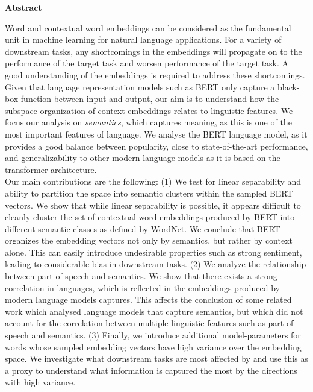 \newpage
{\Huge \bf Abstract}
\vspace{24pt} 


Word and contextual word embeddings can be considered as the fundamental unit in machine learning for natural language applications.
For a variety of downstream tasks, any shortcomings in the embeddings will propagate on to the performance of the target task and worsen performance of the target task.
A good understanding of the embeddings is required to address these shortcomings.
Given that language representation models such as BERT only capture a black-box function between input and output, our aim is to understand how the subspace organization of context embeddings relates to linguistic features.
We focus our analysis on \textit{semantics}, which captures meaning, as this is one of the most important features of language. 
We analyse the BERT language model, as it provides a good balance between popularity, close to state-of-the-art performance, and generalizability to other modern language models as it is based on the transformer architecture.
\\

Our main contributions are the following: (1) We test for linear separability and ability to partition the space into semantic clusters within the sampled BERT vectors.
We show that while linear separability is possible, it appears difficult to cleanly cluster the set of contextual word embeddings produced by BERT into different semantic classes as defined by WordNet.
We conclude that BERT organizes the embedding vectors not only by semantics, but rather by context alone.
This can easily introduce undesirable properties such as strong sentiment, leading to considerable bias in downstream tasks.
(2) We analyze the relationship between part-of-speech and semantics. 
We show that there exists a strong correlation in languages, which is reflected in the embeddings produced by modern language models captures.
This affects the conclusion of some related work which analysed language models that capture semantics, but which did not account for the correlation between multiple linguistic features such as part-of-speech and semantics.
(3) Finally, we introduce additional model-parameters for words whose sampled embedding vectors have high variance over the embedding space.
We investigate what downstream tasks are most affected by and use this as a proxy to understand what information is captured the most by the directions with high variance. \\

\newpage
\vspace*{\fill}
